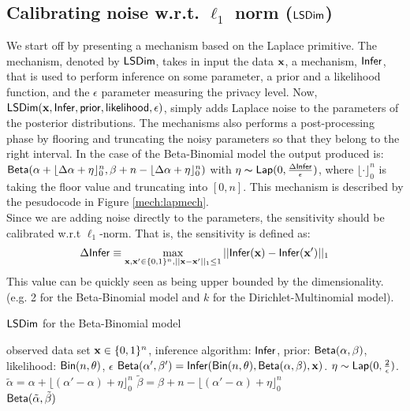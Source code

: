 \documentclass{article}
\begin{document}
\subsection{Calibrating noise w.r.t. $\ell_1$ norm ($\mathsf{LSDim}$)}
We start off by presenting a mechanism based on the Laplace primitive.
The mechanism, denoted by $\mathsf{LSDim}$, takes in input the data $\textbf{x}$, a mechanism, $\mathsf{Infer}$, that is used to perform inference on some parameter,
a prior and a likelihood function, and the $\epsilon$ parameter measuring the privacy level.
Now, $\mathsf{LSDim}(\textbf{x},\mathsf{Infer}, \mathsf{prior}, \mathsf{likelihood}, \epsilon)$,
simply adds Laplace noise to the parameters of the posterior distributions. The mechanisms also performs a
post-processing phase by flooring and  truncating the noisy parameters so that they belong to the right interval.
In the case of the Beta-Binomial model the output produced is: $\mathsf{Beta}(\alpha +  \lfloor{\Delta \alpha + \eta}\rfloor^n_0,\beta + n - \lfloor{\Delta \alpha + \eta}\rfloor^n_0)$
with $\eta \thicksim \mathsf{Lap}(0, \frac{\Delta \mathsf{Infer}}{\epsilon})$, where $\lfloor \cdot \rfloor^n_0$ is taking the floor value and truncating into
$[0,n]$. This mechanism is described by the pesudocode in Figure \ref{mech:lapmech}.\\
Since we are adding noise directly to the parameters, the sensitivity should be calibrated w.r.t $\ell_1$-norm. That is,
the sensitivity is defined as:
\[
   \Delta \mathsf{Infer} \equiv \max\limits_{\textbf{x}, \textbf{x}' \in \{0,1\}^{n}, ||\textbf{x} - \textbf{x}'||_1 \leq 1} ||\mathsf{Infer}(\textbf{x}) - \mathsf{Infer}(\textbf{x}')||_1
\]
This value can be quickly seen as being upper bounded by  the dimensionality. (e.g. 2 for the Beta-Binomial model and  $k$ for
the Dirichlet-Multinomial model).
  \begin{algorithm}
  \caption{$\mathsf{LSDim}$ for the Beta-Binomial model}
  \label{mech:lapmech}
  \begin{algorithmic}
  \INPUT observed data set $\textbf{x} \in \{0,1\}^n$, inference algorithm: $\mathsf{Infer}$, 
  prior: $\mathsf{Beta}(\alpha, \beta)$, likelihood: $\mathsf{Bin}(n, \theta)$, $\epsilon$
  \STATE {} $\mathsf{Beta}(\alpha', \beta') = \mathsf{Infer}(\mathsf{Bin}(n, \theta), \mathsf{Beta}(\alpha, \beta), \textbf{x})$.  
  \STATE \quad  $\eta \sim \mathsf{Lap}(0, \frac{2}{\epsilon})$.
  \STATE \quad  $\tilde{\alpha}=\alpha + \lfloor{(\alpha' - \alpha) + \eta}\rfloor^n_0$ 
  \STATE \quad  $\tilde{\beta}=\beta + n - \lfloor{(\alpha' - \alpha) + \eta}\rfloor^n_0$ \\
   $\mathsf{Beta}(\tilde{\alpha}, \tilde{\beta})$
  \end{algorithmic}
  \end{algorithm}
\end{document}
